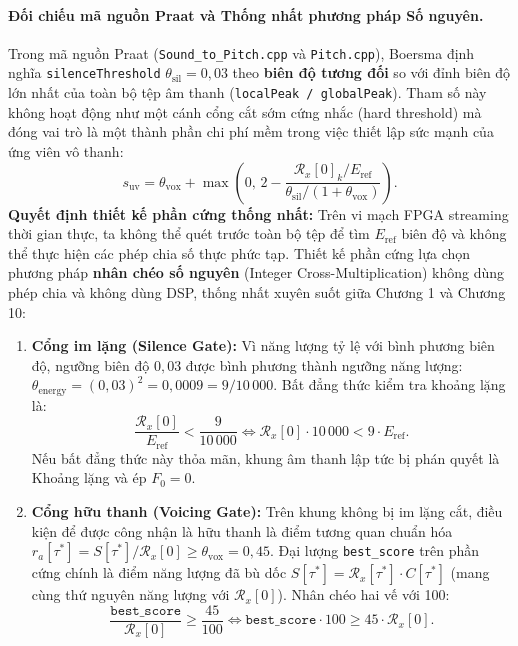 \paragraph{Đối chiếu mã nguồn Praat và Thống nhất phương pháp Số nguyên.}
Trong mã nguồn Praat (\texttt{Sound\_to\_Pitch.cpp} và \texttt{Pitch.cpp}), Boersma định nghĩa \texttt{silenceThreshold} $\theta_{\mathrm{sil}} = 0{,}03$ theo \textbf{biên độ tương đối} so với đỉnh biên độ lớn nhất của toàn bộ tệp âm thanh (\texttt{localPeak / globalPeak}). Tham số này không hoạt động như một cánh cổng cắt sớm cứng nhắc (hard threshold) mà đóng vai trò là một thành phần chi phí mềm trong việc thiết lập sức mạnh của ứng viên vô thanh:
\[
s_{\mathrm{uv}} = \theta_{\mathrm{vox}} + \max\left(0,\, 2 - \frac{\mathcal{R}_x[0]_k / E_{\mathrm{ref}}}{\theta_{\mathrm{sil}} / (1 + \theta_{\mathrm{vox}})}\right).
\]
\textbf{Quyết định thiết kế phần cứng thống nhất:}
Trên vi mạch FPGA streaming thời gian thực, ta không thể quét trước toàn bộ tệp để tìm $E_{\mathrm{ref}}$ biên độ và không thể thực hiện các phép chia số thực phức tạp. Thiết kế phần cứng lựa chọn phương pháp \textbf{nhân chéo số nguyên} (Integer Cross-Multiplication) không dùng phép chia và không dùng DSP, thống nhất xuyên suốt giữa Chương 1 và Chương 10:
\begin{enumerate}[leftmargin=1.4em]
    \item \textbf{Cổng im lặng (Silence Gate):} Vì năng lượng tỷ lệ với bình phương biên độ, ngưỡng biên độ $0{,}03$ được bình phương thành ngưỡng năng lượng: $\theta_{\mathrm{energy}} = (0{,}03)^2 = 0{,}0009 = 9 / 10\,000$. Bất đẳng thức kiểm tra khoảng lặng là:
    \[
    \frac{\mathcal{R}_x[0]}{E_{\mathrm{ref}}} < \frac{9}{10\,000} \iff \mathcal{R}_x[0] \cdot 10\,000 < 9 \cdot E_{\mathrm{ref}}.
    \]
    Nếu bất đẳng thức này thỏa mãn, khung âm thanh lập tức bị phán quyết là Khoảng lặng và ép $F_0 = 0$.
    \item \textbf{Cổng hữu thanh (Voicing Gate):} Trên khung không bị im lặng cắt, điều kiện để được công nhận là hữu thanh là điểm tương quan chuẩn hóa $r_a[\tau^*] = S[\tau^*] / \mathcal{R}_x[0] \ge \theta_{\mathrm{vox}} = 0{,}45$. Đại lượng \texttt{best\_score} trên phần cứng chính là điểm năng lượng đã bù dốc $S[\tau^*] = \mathcal{R}_x[\tau^*] \cdot C[\tau^*]$ (mang cùng thứ nguyên năng lượng với $\mathcal{R}_x[0]$). Nhân chéo hai vế với 100:
    \[
    \frac{\texttt{best\_score}}{\mathcal{R}_x[0]} \ge \frac{45}{100} \iff \texttt{best\_score} \cdot 100 \ge 45 \cdot \mathcal{R}_x[0].
    \]
\end{enumerate}

